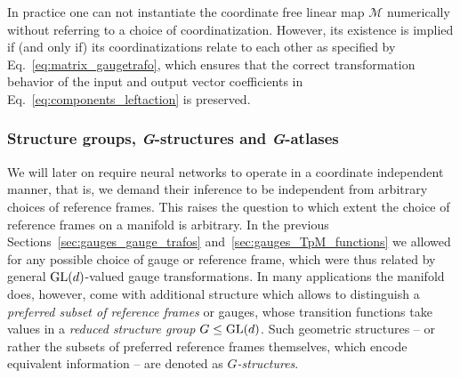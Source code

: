 In practice one can not instantiate the coordinate free linear map $\mathcal{M}$ numerically without referring to a choice of coordinatization.
However, its existence is implied if (and only if) its coordinatizations relate to each other as specified by Eq.~\eqref{eq:matrix_gaugetrafo}, which ensures that the correct transformation behavior of the input and output vector coefficients in Eq.~\eqref{eq:components_leftaction} is preserved.












\subsubsection{Structure groups, \textit{G}-structures and \textit{G}-atlases}
\label{sec:local_G-structure_G-atlas}

We will later on require neural networks to operate in a coordinate independent manner, that is, we demand their inference to be independent from arbitrary choices of reference frames.
This raises the question to which extent the choice of reference frames on a manifold is arbitrary.
In the previous Sections~\ref{sec:gauges_gauge_trafos} and~\ref{sec:gauges_TpM_functions} we allowed for any possible choice of gauge or reference frame, which were thus related by general $\operatorname{GL}(d)$-valued gauge transformations.
In many applications the manifold does, however, come with additional structure which allows to distinguish a \emph{preferred subset of reference frames} or gauges, whose transition functions take values in a \emph{reduced structure group} $G\leq\operatorname{GL}(d)$.
Such geometric structures -- or rather the subsets of preferred reference frames themselves, which encode equivalent information -- are denoted as \emph{$G$-structures}.


